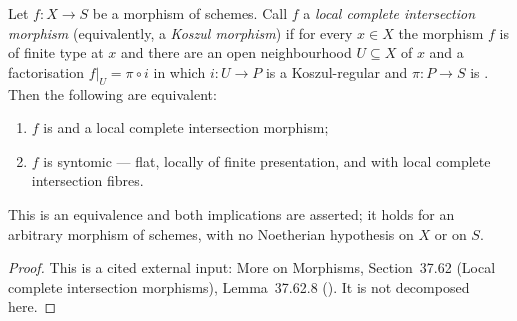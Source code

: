 \begin{lemma}
\label{lem:pc-flat-lci-syntomic}
Let $f:X\to S$ be a morphism of schemes.  Call $f$ a \emph{local complete
intersection morphism} (equivalently, a \emph{Koszul morphism}) if for
every $x\in X$ the morphism $f$ is of finite type at $x$ and there are an
open neighbourhood $U\subseteq X$ of $x$ and a factorisation
$f|_U=\pi\circ i$ in which $i:U\to P$ is a Koszul-regular
 and $\pi:P\to S$ is
.  Then the following are
equivalent:
\begin{enumerate}
\item $f$ is  and a local
complete intersection morphism;
\item $f$ is syntomic --- flat, locally of finite presentation, and with
local complete intersection fibres.
\end{enumerate}
This is an equivalence and both implications are asserted; it holds for
an arbitrary morphism of schemes, with no Noetherian hypothesis on $X$ or
on $S$.
\end{lemma}
\begin{proof}
This is a cited external input: More on Morphisms, Section~37.62 (Local
complete intersection morphisms), Lemma~37.62.8 ().
It is not decomposed here.
\end{proof}

